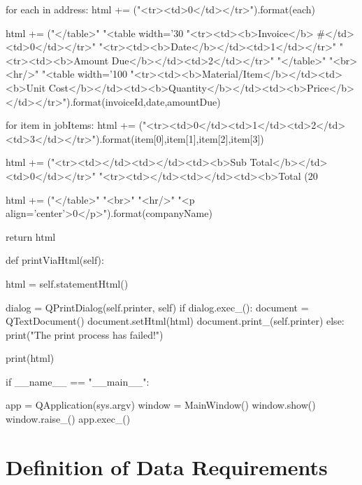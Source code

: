 \begin{python}
        for each in address:
            html += ("<tr><td>{0}</td></tr>").format(each)


        html += ("</table>"
                 "<table width='30%
                 "<tr><td><b>Invoice</b> #</td><td>{0}</td></tr>"
                 "<tr><td><b>Date</b></td><td>{1}</td></tr>"
                 "<tr><td><b>Amount Due</b></td><td>{2}</td></tr>"
                 "</table>"
                 "<br><hr/>"
                 "<table width='100%
                 "<tr><td><b>Material/Item</b></td><td><b>Unit Cost</b></td><td><b>Quantity</b></td><td><b>Price</b></td></tr>").format(invoiceId,date,amountDue)

        for item in jobItems:
            html += ("<tr><td>{0}</td><td>{1}</td><td>{2}</td><td>{3}</td></tr>").format(item[0],item[1],item[2],item[3])

        html += ("<tr><td></td><td></td><td><b>Sub Total</b></td><td>{0}</td></tr>"
                 "<tr><td></td><td></td><td><b>Total (20%

        html += ("</table>"
                 "<br>"
                 "<hr/>"
                 "<p align='center'>{0}</p>").format(companyName)


        return html

        

    def printViaHtml(self):

        html = self.statementHtml()

        dialog = QPrintDialog(self.printer, self)
        if dialog.exec_():
            document = QTextDocument()
            document.setHtml(html)
            document.print_(self.printer)
        else:
            print("The print process has failed!")

        print(html)
        


if __name__ == "__main__":

    app = QApplication(sys.argv)
    window = MainWindow()
    window.show()
    window.raise_()
    app.exec_()


\end{python}

\section{Definition of Data Requirements}

